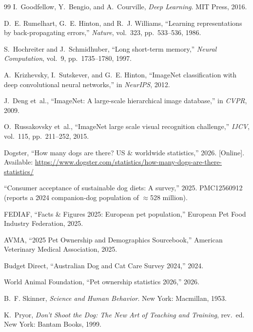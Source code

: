 \begin{thebibliography}{99}
I.~Goodfellow, Y.~Bengio, and A.~Courville, \emph{Deep Learning}. MIT Press,
2016.

D.~E. Rumelhart, G.~E. Hinton, and R.~J. Williams, ``Learning representations by
back-propagating errors,'' \emph{Nature}, vol.~323, pp.~533--536, 1986.

S.~Hochreiter and J.~Schmidhuber, ``Long short-term memory,''
\emph{Neural Computation}, vol.~9, pp.~1735--1780, 1997.

A.~Krizhevsky, I.~Sutskever, and G.~E. Hinton, ``ImageNet classification with
deep convolutional neural networks,'' in \emph{NeurIPS}, 2012.

J.~Deng et~al., ``ImageNet: A large-scale hierarchical image database,'' in
\emph{CVPR}, 2009.

O.~Russakovsky et~al., ``ImageNet large scale visual recognition challenge,''
\emph{IJCV}, vol.~115, pp.~211--252, 2015.

Dogster, ``How many dogs are there? US \& worldwide statistics,'' 2026.
[Online]. Available: \url{https://www.dogster.com/statistics/how-many-dogs-are-there-statistics/}

``Consumer acceptance of sustainable dog diets: A survey,'' 2025.
PMC12560912 (reports a 2024 companion-dog population of $\approx$528 million).

FEDIAF, ``Facts \& Figures 2025: European pet population,'' European Pet Food
Industry Federation, 2025.

AVMA, ``2025 Pet Ownership and Demographics Sourcebook,'' American Veterinary
Medical Association, 2025.

Budget Direct, ``Australian Dog and Cat Care Survey 2024,'' 2024.

World Animal Foundation, ``Pet ownership statistics 2026,'' 2026.

B.~F. Skinner, \emph{Science and Human Behavior}. New York: Macmillan, 1953.

K.~Pryor, \emph{Don't Shoot the Dog: The New Art of Teaching and Training},
rev.~ed. New York: Bantam Books, 1999.


\end{thebibliography}

